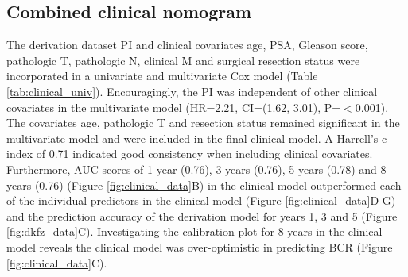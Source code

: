 \documentclass[twocolumn]{bmcart}%
\begin{document}
\subsection*{\textbf{Combined clinical nomogram}}
The derivation dataset PI and clinical covariates age, PSA, Gleason score, pathologic T, pathologic N, clinical M and surgical resection status were incorporated in a univariate and multivariate Cox model (Table \ref{tab:clinical_univ}). Encouragingly, the PI was independent of other clinical covariates in the multivariate model (HR=2.21, CI=(1.62, 3.01), P=$<$0.001). The covariates age, pathologic T and resection status remained significant in the multivariate model and were included in the final clinical model. A Harrell's c-index of 0.71 indicated good consistency when including clinical covariates. Furthermore, AUC scores of 1-year (0.76), 3-years (0.76), 5-years (0.78) and 8-years (0.76) (Figure \ref{fig:clinical_data}B) in the clinical model outperformed each of the individual predictors in the clinical model (Figure \ref{fig:clinical_data}D-G) and the prediction accuracy of the derivation model for years 1, 3 and 5 (Figure \ref{fig:dkfz_data}C). Investigating the calibration plot for 8-years in the clinical model reveals the clinical model was over-optimistic in predicting BCR (Figure \ref{fig:clinical_data}C).
\end{document}
